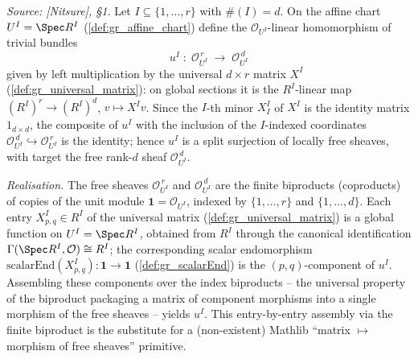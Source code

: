 \begin{definition}


  \label{def:gr_chart_quotient}
  \textit{Source: [Nitsure], \S 1.}
  Let \(I \subseteq \{1,\dots,r\}\) with \(\#(I) = d\). On the affine chart
  \(U^I = \Spec R^I\) (\cref{def:gr_affine_chart}) define the
  \(\mathcal{O}_{U^I}\)-linear homomorphism of trivial bundles
  \[
    u^I \;:\; \mathcal{O}_{U^I}^{\,r}
      \;\longrightarrow\; \mathcal{O}_{U^I}^{\,d}
  \]
  given by left multiplication by the universal \(d \times r\) matrix \(X^I\)
  (\cref{def:gr_universal_matrix}): on global sections it is the \(R^I\)-linear
  map \((R^I)^{r} \to (R^I)^{d}\), \(v \mapsto X^I v\). Since the \(I\)-th minor
  \(X^I_I\) of \(X^I\) is the identity matrix \(1_{d \times d}\), the composite of
  \(u^I\) with the inclusion of the \(I\)-indexed coordinates
  \(\mathcal{O}_{U^I}^{\,d} \hookrightarrow \mathcal{O}_{U^I}^{\,r}\) is the
  identity; hence \(u^I\) is a split surjection of locally free sheaves, with
  target the free rank-\(d\) sheaf \(\mathcal{O}_{U^I}^{\,d}\).

  \emph{Realisation.} The free sheaves \(\mathcal{O}_{U^I}^{\,r}\) and
  \(\mathcal{O}_{U^I}^{\,d}\) are the finite biproducts (coproducts) of copies of
  the unit module \(\mathbf{1} = \mathcal{O}_{U^I}\), indexed by \(\{1,\dots,r\}\)
  and \(\{1,\dots,d\}\). Each entry \(X^I_{p,q} \in R^I\) of the universal matrix
  (\cref{def:gr_universal_matrix}) is a global function on \(U^I = \Spec R^I\),
  obtained from \(R^I\) through the canonical identification
  \(\Gamma(\Spec R^I, \mathcal{O}) \cong R^I\); the corresponding scalar
  endomorphism \(\mathrm{scalarEnd}(X^I_{p,q}) : \mathbf{1} \to \mathbf{1}\)
  (\cref{def:gr_scalarEnd}) is the \((p,q)\)-component of \(u^I\). Assembling these
  components over the index biproducts -- the universal property of the biproduct
  packaging a matrix of component morphisms into a single morphism of the free
  sheaves -- yields \(u^I\). This entry-by-entry assembly via the finite biproduct
  is the substitute for a (non-existent) Mathlib ``matrix \(\mapsto\) morphism of
  free sheaves'' primitive.
\end{definition}


